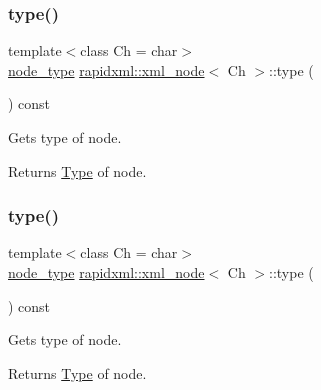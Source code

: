 \subsubsection{\texorpdfstring{type()}{type()}\hspace{0.1cm}{\footnotesize\ttfamily [1/4]}}
{\footnotesize\ttfamily template$<$class Ch = char$>$ \\
\mbox{\hyperlink{namespacerapidxml_abb456db38f7efb746c4330eed6072a7c}{node\+\_\+type}} \mbox{\hyperlink{classrapidxml_1_1xml__node}{rapidxml\+::xml\+\_\+node}}$<$ Ch $>$\+::type (\begin{DoxyParamCaption}{ }\end{DoxyParamCaption}) const\hspace{0.3cm}{\ttfamily [inline]}}

Gets type of node. \begin{DoxyReturn}{Returns}
\mbox{\hyperlink{class_type}{Type}} of node. 
\end{DoxyReturn}
\mbox{\label{classrapidxml_1_1xml__node_a5f91729128856b0aaab598d4364ace60}} 
\subsubsection{\texorpdfstring{type()}{type()}\hspace{0.1cm}{\footnotesize\ttfamily [2/4]}}
{\footnotesize\ttfamily template$<$class Ch = char$>$ \\
\mbox{\hyperlink{namespacerapidxml_abb456db38f7efb746c4330eed6072a7c}{node\+\_\+type}} \mbox{\hyperlink{classrapidxml_1_1xml__node}{rapidxml\+::xml\+\_\+node}}$<$ Ch $>$\+::type (\begin{DoxyParamCaption}{ }\end{DoxyParamCaption}) const\hspace{0.3cm}{\ttfamily [inline]}}

Gets type of node. \begin{DoxyReturn}{Returns}
\mbox{\hyperlink{class_type}{Type}} of node. 
\end{DoxyReturn}
\mbox{\label{classrapidxml_1_1xml__node_a499bbc9300c1b06821d5c08b24164c68}} 
